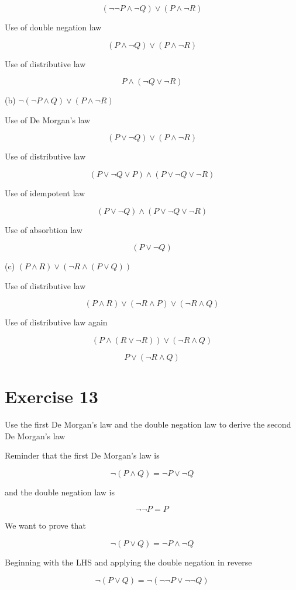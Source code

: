 \documentclass[11pt]{article}
\begin{document}
$$(\neg \neg P \wedge \neg Q) \vee (P \wedge \neg R)$$

Use of double negation law

$$(P \wedge \neg Q) \vee (P \wedge \neg R)$$

Use of distributive law

$$P \wedge (\neg Q \vee \neg R)$$

\noindent (b) $\neg (\neg P \wedge Q) \vee (P \wedge \neg R)$

Use of De Morgan's law

$$(P \vee \neg Q) \vee (P \wedge \neg R)$$

Use of distributive law

$$(P \vee \neg Q \vee P) \wedge (P \vee \neg Q \vee \neg R)$$

Use of idempotent law

$$(P \vee \neg Q) \wedge (P \vee \neg Q \vee \neg R)$$

Use of absorbtion law

$$(P \vee \neg Q)$$

\noindent (c) $(P \wedge R) \vee (\neg R \wedge (P \vee Q))$

Use of distributive law

$$(P \wedge R) \vee (\neg R \wedge P) \vee (\neg R \wedge Q)$$

Use of distributive law again

$$(P \wedge (R \vee \neg R)) \vee (\neg R \wedge Q)$$

$$P \vee (\neg R \wedge Q)$$

\section*{Exercise 13}

Use the first De Morgan's law and the double negation law to derive the second De Morgan's law

Reminder that the first De Morgan's law is

$$\neg (P \wedge Q) = \neg P \vee \neg Q$$

and the double negation law is 

$$\neg \neg P = P$$

We want to prove that 

$$\neg (P \vee Q) = \neg P \wedge \neg Q$$

Beginning with the LHS and applying the double negation in reverse 

$$\neg (P \vee Q) = \neg (\neg \neg P \vee \neg \neg Q)$$
\end{document}
